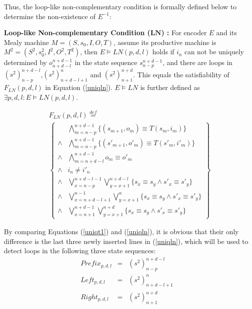 \documentclass[journal]{IEEEtran}
\begin{document}
Thus,
the loop-like non-complementary condition is formally defined below to determine the non-existence of $E^{-1}$:

\begin{definition11}\label{def_lnc}%
\textbf{Loop-like Non-complementary Condition ($\boldsymbol{LN}$) :}
For encoder $E$ and its Mealy machine $M=(S,s_0,I,O,T)$,
assume its productive machine is $M^2=(S^2,s_0^2,I^2,O^2,T^2)$,
then $E\vDash LN(p,d,l)$ holds if
$i_n$ can not be uniquely determined by $o_{n+d-l}^{n+d-1}$ in the state sequence $s_{n-p}^{n+d-1}$,
and there are loops in $(s^2)_{n-p}^{n+d-l}$,$(s^2)_{n+d-l+1}^n$ and $(s^2)_{n+1}^{n+d}$.
This equals the satisfiability of $F_{LN}(p,d,l)$ in Equation (\ref{uniqln}).
$E\vDash LN$ is further defined as $\exists p,d,l:E\vDash LN(p,d,l)$.
\end{definition11}


\begin{equation}\label{uniqln}
\begin{split}
&F_{LN}(p,d,l)\overset{def}{=}\\
&\left\{
\begin{array}{cc}
&\bigwedge_{m=n-p}^{n+d-1}
\{
(s_{m+1},o_m)\equiv T(s_m,i_m)
\}
\\
\wedge&\bigwedge_{m=n-p}^{n+d-1}
\{
(s'_{m+1},o'_m)\equiv T(s'_m,i'_m)
\}
\\
\wedge&\bigwedge_{m=n+d-l}^{n+d-1}o_m\equiv o'_m \\
\wedge& i_n\ne i'_n \\
\wedge&\bigvee_{x=n-p}^{n+d-l-1}\bigvee_{y=x+1}^{n+d-l} \{s_x\equiv s_y\wedge s'_x\equiv s'_y\} \\
\wedge&\bigvee_{x=n+d-l+1}^{n-1}\bigvee_{y=x+1}^{n} \{s_x\equiv s_y\wedge s'_x\equiv s'_y\} \\
\wedge&\bigvee_{x=n+1}^{n+d-1}\bigvee_{y=x+1}^{n+d} \{s_x\equiv s_y\wedge s'_x\equiv s'_y\}
\end{array}
\right\}
\end{split}
\end{equation}



By comparing Equations (\ref{uniqt1}) and (\ref{uniqln}),
it is obvious that their only difference is the last three newly inserted lines in (\ref{uniqln}),
which will be used to detect loops in the following three state sequences:
\begin{equation}
\begin{array}{ccc}
Prefix_{p,d,l}&=&(s^2)_{n-p}^{n+d-l} \\
Left_{p,d,l}&=&(s^2)_{n+d-l+1}^n \\
Right_{p,d,l}&=&(s^2)_{n+1}^{n+d}
\end{array}
\end{equation}
\end{document}
